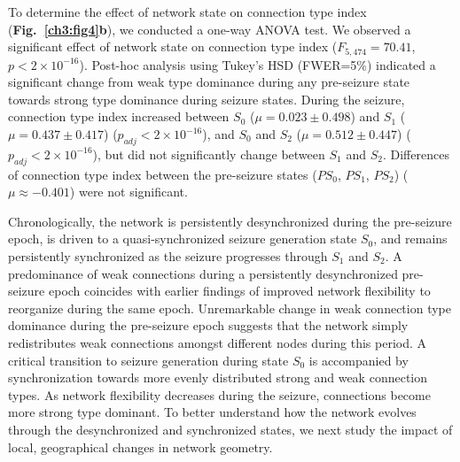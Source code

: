 To determine the effect of network state on connection type index (\textbf{Fig.~{\ref{ch3:fig4}b}}), we conducted a one-way ANOVA test. We observed a significant effect of network state on connection type index ($F_{5,474}=70.41$, $p<2\times10^{-16}$). Post-hoc analysis using Tukey's HSD (FWER=5\%) indicated a significant change from weak type dominance during any pre-seizure state towards strong type dominance during seizure states. During the seizure, connection type index increased between $S_0$ ($\mu=0.023\pm0.498$) and $S_1$ ($\mu=0.437\pm0.417$) ($p_{adj}<2\times10^{-16}$), and $S_0$ and $S_2$ ($\mu=0.512\pm0.447$) ($p_{adj}<2\times10^{-16}$), but did not significantly change between $S_1$ and $S_2$. Differences of connection type index between the pre-seizure states ($PS_0$, $PS_1$, $PS_2$) ($\mu\approx-0.401$) were not significant.
    
Chronologically, the network is persistently desynchronized during the pre-seizure epoch, is driven to a quasi-synchronized seizure generation state $S_0$, and remains persistently synchronized as the seizure progresses through $S_1$ and $S_2$. A predominance of weak connections during a persistently desynchronized pre-seizure epoch coincides with earlier findings of improved network flexibility to reorganize during the same epoch. Unremarkable change in weak connection type dominance during the pre-seizure epoch suggests that the network simply redistributes weak connections amongst different nodes during this period. A critical transition to seizure generation during state $S_0$ is accompanied by synchronization towards more evenly distributed strong and weak connection types. As network flexibility decreases during the seizure, connections become more strong type dominant. To better understand how the network evolves through the desynchronized and synchronized states, we next study the impact of local, geographical changes in network geometry.

